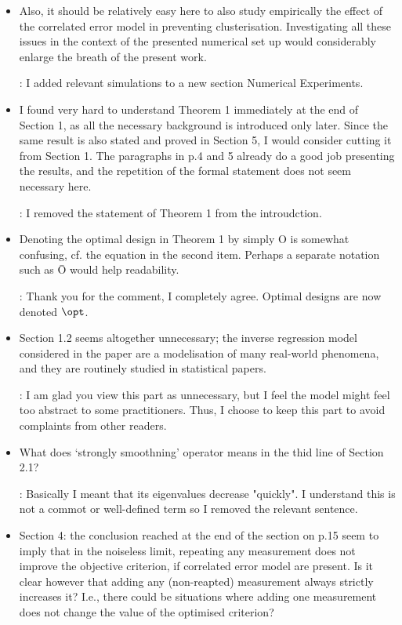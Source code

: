 \documentclass{amsart}
\begin{document}
\begin{itemize}
\item Also, it should be relatively easy here to also study
  empirically the effect of the correlated error model in preventing
  clusterisation. Investigating all these issues in the context of the
  presented numerical set up would considerably enlarge the breath of
  the present work.

  \answer: I added relevant simulations to a new section Numerical
  Experiments.

\item I found very hard to understand Theorem 1 immediately at the end
  of Section 1, as all the necessary background is introduced only
  later. Since the same result is also stated and proved in Section 5,
  I would consider cutting it from Section 1. The paragraphs in p.4
  and 5 already do a good job presenting the results, and the
  repetition of the formal statement does not seem necessary here.

  \answer: I removed the statement of Theorem 1 from the introudction.

\item Denoting the optimal design in Theorem 1 by simply O is somewhat
  confusing, cf. the equation in the second item. Perhaps a separate
  notation such as Ō would help readability.

  \answer: Thank you for the comment, I completely agree. Optimal
  designs are now denoted $\opt$.

\item Section 1.2 seems altogether unnecessary; the inverse regression
  model considered in the paper are a modelisation of many real-world
  phenomena, and they are routinely studied in statistical papers.

  \answer: I am glad you view this part as unnecessary, but I feel the
  model might feel too abstract to some practitioners. Thus, I choose
  to keep this part to avoid complaints from other readers.


\item What does ‘strongly smoothning’ operator means in the thid line of Section 2.1?

  \answer: Basically I meant that its eigenvalues decrease
  "quickly". I understand this is not a commot or well-defined term so
  I removed the relevant sentence.
  
\item Section 4: the conclusion reached at the end of the section on
  p.15 seem to imply that in the noiseless limit, repeating any
  measurement does not improve the objective criterion, if correlated
  error model are present. Is it clear however that adding any
  (non-reapted) measurement always strictly increases it? I.e., there
  could be situations where adding one measurement does not change the
  value of the optimised criterion?


\end{itemize}
\end{document}
